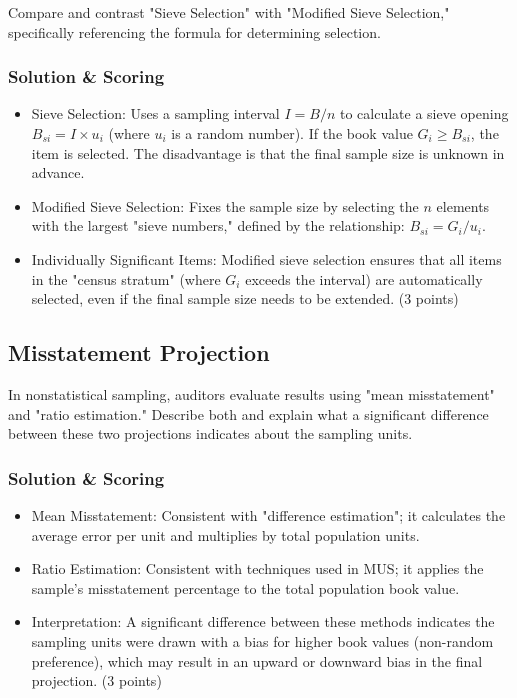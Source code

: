 \documentclass[12pt,a4paper]{memoir}
\begin{document}
Compare and contrast "Sieve Selection" with "Modified Sieve Selection," specifically referencing the formula for determining selection.

\subsubsection{Solution \& Scoring}
\begin{itemize}
\item Sieve Selection: Uses a sampling interval $I = B/n$ to calculate a sieve opening $B_{si} = I \times u_i$ (where $u_i$ is a random number). If the book value $G_i \geq B_{si}$, the item is selected. The disadvantage is that the final sample size is unknown in advance.
\item Modified Sieve Selection: Fixes the sample size by selecting the $n$ elements with the largest "sieve numbers," defined by the relationship: $B_{si} = G_i / u_i$.
\item Individually Significant Items: Modified sieve selection ensures that all items in the "census stratum" (where $G_i$ exceeds the interval) are automatically selected, even if the final sample size needs to be extended. (3 points)
\end{itemize}

\subsection{Misstatement Projection}

In nonstatistical sampling, auditors evaluate results using "mean misstatement" and "ratio estimation." Describe both and explain what a significant difference between these two projections indicates about the sampling units.

\subsubsection{Solution \& Scoring}
\begin{itemize}
\item Mean Misstatement: Consistent with "difference estimation"; it calculates the average error per unit and multiplies by total population units.
\item Ratio Estimation: Consistent with techniques used in MUS; it applies the sample's misstatement percentage to the total population book value.
\item Interpretation: A significant difference between these methods indicates the sampling units were drawn with a bias for higher book values (non-random preference), which may result in an upward or downward bias in the final projection. (3 points)
\end{itemize}
\end{document}
